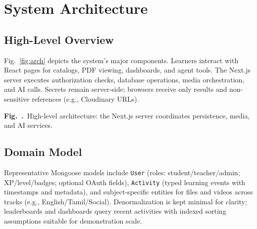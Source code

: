 \documentclass[conference]{IEEEtran}
\newcommand{\figcap}[2]{%
  \par\addvspace{2pt}%
  \refstepcounter{figure}\label{#1}%
  {\footnotesize\textbf{Fig.~\thefigure.}~#2\par}%
}
\begin{document}
\section{System Architecture}

\subsection{High-Level Overview}

Fig.~\ref{fig:arch} depicts the system's major components. Learners interact with React pages for catalogs, PDF viewing, dashboards, and agent tools. The Next.js server executes authorization checks, database operations, media orchestration, and AI calls. Secrets remain server-side; browsers receive only results and non-sensitive references (e.g., Cloudinary URLs).

\begin{center}
\figcap{fig:arch}{High-level architecture: the Next.js server coordinates persistence, media, and AI services.}
\end{center}

\subsection{Domain Model}

Representative Mongoose models include \texttt{User} (roles: student/teacher/admin; XP/level/badges; optional OAuth fields), \texttt{Activity} (typed learning events with timestamps and metadata), and subject-specific entities for files and videos across tracks (e.g., English/Tamil/Social). Denormalization is kept minimal for clarity; leaderboards and dashboards query recent activities with indexed sorting assumptions suitable for demonstration scale.
\end{document}
